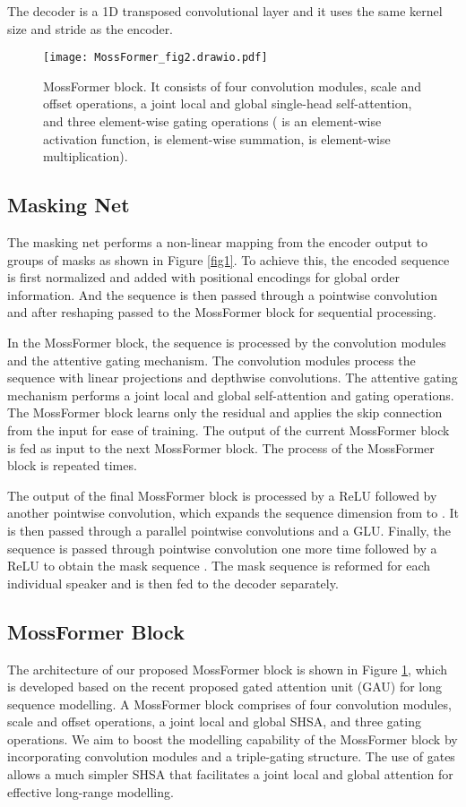 \documentclass[9pt]{extarticle}
\begin{document}
The decoder is a 1D transposed convolutional layer and it uses the same  kernel size and stride as the encoder. 
\begin{figure}[t]
  \centering
  \texttt{[image: MossFormer\_fig2.drawio.pdf]}
  \caption{MossFormer block. It consists of four convolution modules, scale and offset operations, a joint local and global single-head self-attention, and three element-wise gating operations ( is an element-wise activation function,  is element-wise summation,   is element-wise multiplication).}
  \label{fig2}
\end{figure} 
\subsection{Masking Net}   
The masking net performs a non-linear mapping from the encoder output to  groups of masks as shown in Figure \ref{fig1}. To achieve this, the encoded sequence  is first normalized and added with positional encodings for global order information. And the sequence is then passed through a pointwise convolution and after reshaping passed to the MossFormer block for sequential processing. 

In the MossFormer block, the sequence is processed by the convolution modules and the attentive gating mechanism. The  convolution modules process the sequence with linear projections and depthwise convolutions. The attentive gating mechanism performs a joint local and global self-attention and gating operations. 
The MossFormer block learns only the residual and applies the skip connection from the input for ease of training. The output of the current MossFormer block is fed as input to the next MossFormer block. The process of the MossFormer block is repeated  times.  

The output of the final MossFormer block is processed by a ReLU followed by another pointwise convolution, which expands the sequence dimension from  to . It is then passed through a parallel pointwise convolutions and a GLU. Finally, the sequence is passed through pointwise convolution one more time followed by a ReLU to obtain the mask sequence . The mask sequence  is reformed for each individual speaker   and is then fed to the decoder separately. 

\subsection{MossFormer Block} 
The architecture of our proposed MossFormer block is shown in Figure \ref{fig2}, which is developed based on the recent proposed gated attention unit (GAU) \cite{Hua2022Z} for long sequence modelling. A MossFormer block comprises of four convolution modules, scale and offset operations, a joint local and global SHSA, and three gating operations. We aim to boost the modelling capability of the MossFormer block by incorporating convolution modules and a triple-gating structure. The use of gates allows a much simpler SHSA that facilitates a joint local and global attention for effective long-range modelling. 
\end{document}
